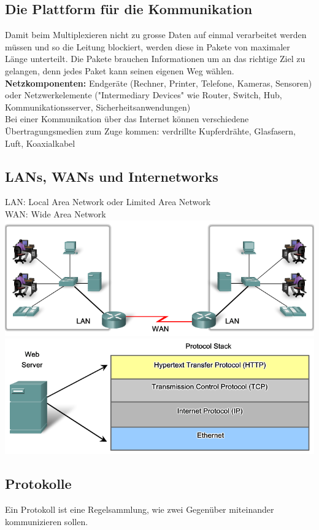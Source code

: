 \documentclass[a4paper,10pt]{article}
\newcommand{\Bold}[1]{\textbf{#1}} %
\begin{document}
\subsection{Die Plattform für die Kommunikation}
Damit beim Multiplexieren nicht zu grosse Daten auf einmal verarbeitet werden müssen und so die Leitung blockiert, werden diese in Pakete von maximaler Länge unterteilt. Die Pakete brauchen Informationen um an das richtige Ziel zu gelangen, denn jedes Paket kann seinen eigenen Weg wählen.\\
\Bold{Netzkomponenten:} Endgeräte (Rechner, Printer, Telefone, Kameras, Sensoren) oder Netzwerkelemente ("Intermediary Devices" wie Router, Switch, Hub, Kommunikationsserver, Sicherheitsanwendungen)\\
Bei einer Kommunikation über das Internet können verschiedene Übertragungsmedien zum Zuge kommen: verdrillte Kupferdrähte, Glasfasern, Luft, Koaxialkabel
\subsection{LANs, WANs und Internetworks}
LAN: Local Area Network oder Limited Area Network\\
WAN: Wide Area Network\\
\includegraphics[scale=0.4]{DNet1_LAN_WAN.png}\includegraphics[scale=0.4]{DNet1_Protokollstack.png}
\subsection{Protokolle}
Ein Protokoll ist eine Regelsammlung, wie zwei Gegenüber miteinander kommunizieren sollen.
\end{document}

